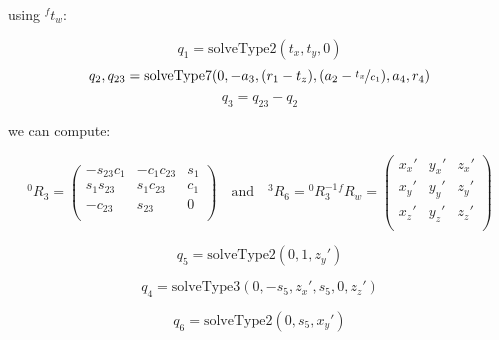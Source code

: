 \documentclass[11pt, oneside]{article}   	%
\begin{document}
using ${}^ft_w$:

\begin{equation}
q_1 = \text{solveType2}(t_x,t_y,0)
\end{equation}
\begin{equation}
q_2,q_{23} = \text{solveType7}(0,-a_3,(r_1 - t_z) , (a_2 - \nicefrac{t_x}{c_1}), a_4, r_4)
\end{equation}
\begin{equation}
q_3 = q_{23} - q_2
\end{equation}

we can compute:

\begin{equation*}
^{0}R_3 = 
\begin{pmatrix}
-s_{23} c_1 & -c_1 c_23 & s_1 \\
s_1 s_23 & s_1 c_23 & c_1 \\
-c_23 & s_23 & 0 \\
\end{pmatrix}
\quad \text{and} \quad{}^3R_6 = {}^0R_3^{-1}{}^fR_w = 
\begin{pmatrix}
x_x' & y_x' & z_x'\\
x_y' & y_y' & z_y'\\
x_z' & y_z' & z_z'\\
\end{pmatrix}
\end{equation*}

\begin{equation}
q_5 = \text{solveType2}(0,1,z_y')
\end{equation}

\begin{equation}
q_4 = \text{solveType3}(0,-s_5,z_x',s_5,0,z_z')
\end{equation}

\begin{equation}
q_6 = \text{solveType2}(0,s_5,x_y')
\end{equation}
\end{document}
